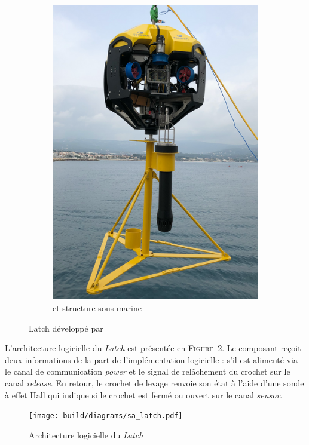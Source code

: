 \begin{figure}[!htb]
\begin{subfigure}[b]{0.38\textwidth}
						\includegraphics[width=\textwidth]{imgs/latch_latched.png}
						\caption{\atoll{} et structure sous-marine}
					\end{subfigure}
					\caption{Latch développé par \forssea{}}
					\label{fig:latch_photo}
				\end{figure}

				L'architecture logicielle du \textit{Latch} est présentée en \textsc{Figure}~\ref{fig:sa_latch}. Le composant reçoit deux informations de la part de l'implémentation logicielle : s'il est alimenté via le canal de communication \textit{power} et le signal de relâchement du crochet sur le canal \textit{release}. En retour, le crochet de levage renvoie son état à l'aide d'une sonde à effet Hall qui indique si le crochet est fermé ou ouvert sur le canal \textit{sensor}.

				\begin{figure}[!htb]
					\centering
					\texttt{[image: build/diagrams/sa\_latch.pdf]}
					\caption{Architecture logicielle du \textit{Latch}}
					\label{fig:sa_latch}
				\end{figure}
							
